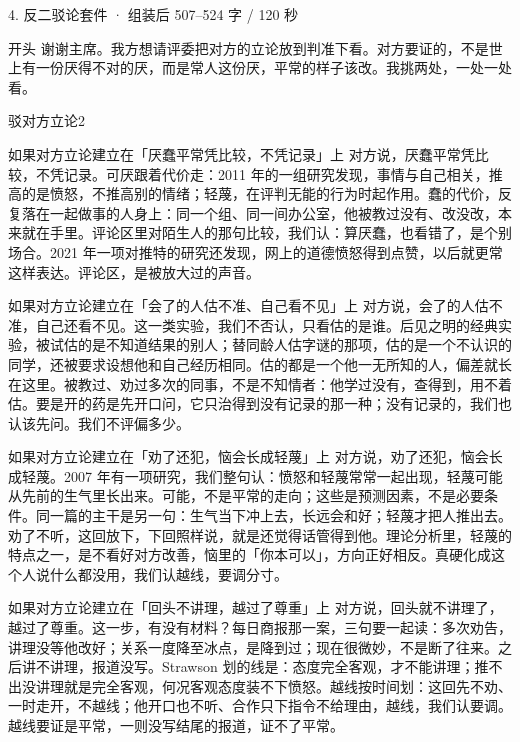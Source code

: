 \documentclass[script,con]{debate}
\begin{document}
\begin{kit}{4. 反二驳论}{套件 · 组装后 507–524 字 / 120 秒}
\begin{fixed}{开头}
谢谢主席。我方想请评委把对方的立论放到判准下看。对方要证的，不是世上有一份厌得不对的厌，而是常人这份厌，平常的样子该改。我挑两处，一处一处看。
\end{fixed}
\begin{pick}{驳对方立论}{2}
\begin{module}{如果对方立论建立在「厌蠢平常凭比较，不凭记录」上}
对方说，厌蠢平常凭比较，不凭记录。可厌跟着代价走：2011 年的一组研究发现，事情与自己相关，推高的是愤怒，不推高别的情绪；轻蔑，在评判无能的行为时起作用。蠢的代价，反复落在一起做事的人身上：同一个组、同一间办公室，他被教过没有、改没改，本来就在手里。评论区里对陌生人的那句比较，我们认：算厌蠢，也看错了，是个别场合。2021 年一项对推特的研究还发现，网上的道德愤怒得到点赞，以后就更常这样表达。评论区，是被放大过的声音。
\end{module}
\begin{module}{如果对方立论建立在「会了的人估不准、自己看不见」上}
对方说，会了的人估不准，自己还看不见。这一类实验，我们不否认，只看估的是谁。后见之明的经典实验，被试估的是不知道结果的别人；替同龄人估字谜的那项，估的是一个不认识的同学，还被要求设想他和自己经历相同。估的都是一个他一无所知的人，偏差就长在这里。被教过、劝过多次的同事，不是不知情者：他学过没有，查得到，用不着估。要是开的药是先开口问，它只治得到没有记录的那一种；没有记录的，我们也认该先问。我们不评偏多少。
\end{module}
\begin{module}{如果对方立论建立在「劝了还犯，恼会长成轻蔑」上}
对方说，劝了还犯，恼会长成轻蔑。2007 年有一项研究，我们整句认：愤怒和轻蔑常常一起出现，轻蔑可能从先前的生气里长出来。可能，不是平常的走向；这些是预测因素，不是必要条件。同一篇的主干是另一句：生气当下冲上去，长远会和好；轻蔑才把人推出去。劝了不听，这回放下，下回照样说，就是还觉得话管得到他。理论分析里，轻蔑的特点之一，是不看好对方改善，恼里的「你本可以」，方向正好相反。真硬化成这个人说什么都没用，我们认越线，要调分寸。
\end{module}
\begin{module}{如果对方立论建立在「回头不讲理，越过了尊重」上}
对方说，回头就不讲理了，越过了尊重。这一步，有没有材料？每日商报那一案，三句要一起读：多次劝告，讲理没等他改好；关系一度降至冰点，是降到过；现在很微妙，不是断了往来。之后讲不讲理，报道没写。Strawson 划的线是：态度完全客观，才不能讲理；推不出没讲理就是完全客观，何况客观态度装不下愤怒。越线按时间划：这回先不劝、一时走开，不越线；他开口也不听、合作只下指令不给理由，越线，我们认要调。越线要证是平常，一则没写结尾的报道，证不了平常。

\end{module}
\end{pick}
\end{kit}
\end{document}
